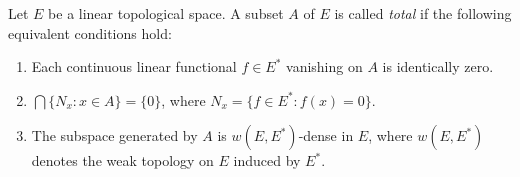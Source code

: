 Let $E$ be a linear topological space. A subset $A$ of $E$ is called \textit{total} if the following equivalent conditions hold:

\begin{enumerate}
\item[(i)] Each continuous linear functional $f \in E^*$ vanishing on $A$ is identically zero.
\item[(ii)] $\bigcap \{N_x : x \in A\} = \{0\}$, where $N_x = \{f \in E^* : f(x) = 0\}$.
\item[(iii)] The subspace generated by $A$ is $w(E, E^*)$-dense in $E$, where $w(E, E^*)$ denotes the weak topology on $E$ induced by $E^*$.
\end{enumerate}
